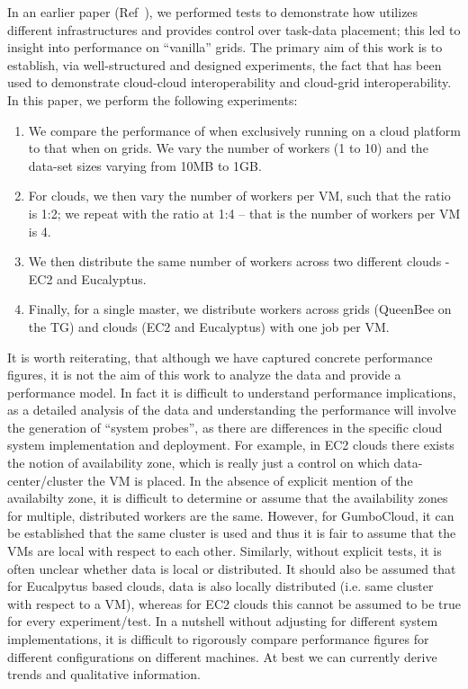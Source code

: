 \documentclass[3p,twocolumn]{elsarticle}
\begin{document}
In an earlier paper (Ref~\cite{saga_ccgrid09}), we performed tests to
demonstrate how \sagamapreduce utilizes different infrastructures and
provides control over task-data placement; this led to insight into
performance on ``vanilla'' grids. The primary aim of this work is to
establish, via well-structured and designed experiments, the fact that
\sagamapreduce has been used to demonstrate cloud-cloud
interoperability and cloud-grid interoperability. In this paper, we
perform the following experiments:
\begin{enumerate}
\item We compare the performance of \sagamapreduce when exclusively
  running on a cloud platform to that when on grids. We vary the
  number of workers (1 to 10) and the data-set sizes varying from 10MB
  to 1GB.
\item For clouds, we then vary the number of workers per VM, such that
  the ratio is 1:2; we repeat with the ratio at 1:4 -- that is the
  number of workers per VM is 4.
\item We then distribute the same number of workers across two
  different clouds - EC2 and Eucalyptus.
\item Finally, for a single master, we distribute workers across grids
  (QueenBee on the TG) and clouds (EC2 and Eucalyptus) with one job
  per VM.
\end{enumerate}
It is worth reiterating, that although we have captured concrete
performance figures, it is not the aim of this work to analyze the
data and provide a performance model. In fact it is difficult to
understand performance implications, as a detailed analysis of the
data and understanding the performance will involve the generation of
``system probes'', as there are differences in the specific cloud
system implementation and deployment.  For example, in EC2 clouds %
there exists the notion of availability zone, which is really just a
control on which data-center/cluster the VM is placed. In the absence
of explicit mention of the availabilty zone, it is difficult to
determine or assume that the availability zones for multiple,
distributed workers are the same. However, for GumboCloud, it can be
established that the same cluster is used and thus it is fair to
assume that the VMs are local with respect to each other.  Similarly,
without explicit tests, it is often unclear whether data is local or
distributed.  It should also be assumed that for Eucalpytus based
clouds, data is also locally distributed (i.e.  same cluster with
respect to a VM), whereas for EC2 clouds this cannot be assumed to be
true for every experiment/test. In a nutshell without adjusting for
different system implementations, it is difficult to rigorously
compare performance figures for different configurations on different
machines. At best we can currently derive trends and qualitative
information.
\end{document}
